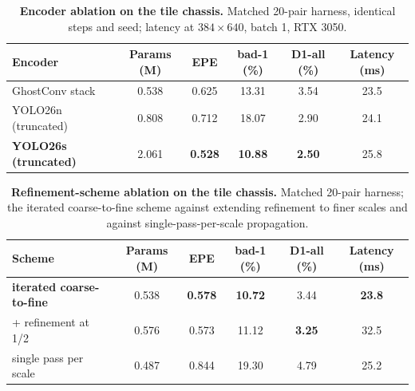 \begin{table}[!htbp]
\centering
\caption{\textbf{Encoder ablation on the tile chassis.} Matched 20-pair harness, identical steps and seed; latency at $384\times 640$, batch 1, RTX 3050.}
\label{tab:ablation_encoder}
\small
\begin{tabular}{lccccc}
\toprule
Encoder & Params (M) & EPE & bad-1 (\%) & D1-all (\%) & Latency (ms)\\
\midrule
GhostConv stack & 0.538 & 0.625 & 13.31 & 3.54 & 23.5\\
YOLO26n (truncated) & 0.808 & 0.712 & 18.07 & 2.90 & 24.1\\
\textbf{YOLO26s (truncated)} & 2.061 & \textbf{0.528} & \textbf{10.88} & \textbf{2.50} & 25.8\\
\bottomrule
\end{tabular}
\end{table}

\begin{table}[!htbp]
\centering
\caption{\textbf{Refinement-scheme ablation on the tile chassis.} Matched 20-pair harness; the iterated coarse-to-fine scheme against extending refinement to finer scales and against single-pass-per-scale propagation.}
\label{tab:ablation_refinement}
\small
\begin{tabular}{lccccc}
\toprule
Scheme & Params (M) & EPE & bad-1 (\%) & D1-all (\%) & Latency (ms)\\
\midrule
\textbf{iterated coarse-to-fine} & 0.538 & \textbf{0.578} & \textbf{10.72} & 3.44 & \textbf{23.8}\\
+ refinement at 1/2 & 0.576 & 0.573 & 11.12 & \textbf{3.25} & 32.5\\
single pass per scale & 0.487 & 0.844 & 19.30 & 4.79 & 25.2\\
\bottomrule
\end{tabular}
\end{table}


